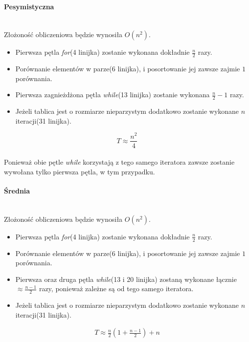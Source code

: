 \paragraph{Pesymistyczna}\mbox{}\\
Złożoność obliczeniowa będzie wynosiła $O(n^2)$.
\begin{itemize}
\item Pierwsza pętla \textit{for}(4 linijka) zostanie wykonana dokładnie $\frac{n}{2}$ razy.
\item Porównanie elementów w parze(6 linijka), i posortowanie jej zawsze zajmie $1$ porównania.
\item Pierwsza zagnieżdżona pętla \textit{while}(13 linijka) zostanie wykonana $\frac{n}{2} -1$ razy.
\item Jeżeli tablica jest o rozmiarze nieparzystym dodatkowo zostanie wykonane $n$ iteracji(31 linijka).
\end{itemize}
\begin{equation*}
T \approx \frac{n^2}{4} 
\end{equation*}
\wyjT\\
Ponieważ obie pętle \textit{while} korzystają z tego samego iteratora zawsze zostanie wywołana tylko pierwsza pętla, w tym przypadku.
\paragraph{Średnia}\mbox{}\\
Złożoność obliczeniowa będzie wynosiła $O(n^2)$.

\begin{itemize}
\item Pierwsza pętla \textit{for}(4 linijka) zostanie wykonana dokładnie $\frac{n}{2}$ razy.
\item Porównanie elementów w parze(6 linijka), i posortowanie jej zawsze zajmie $1$ porównania.
\item Pierwsza oraz druga  pętla \textit{while}(13 i 20 linijka) zostaną wykonane łącznie $\approx \frac{n-1}{2}$ razy, ponieważ zależne są od tego samego iteratora.
\item Jeżeli tablica jest o rozmiarze nieparzystym dodatkowo zostanie wykonane $n$ iteracji(31 linijka).
\end{itemize}
\begin{equation*}
\begin{multlined}
T \approx \frac{n}{2} (1+ \frac{n-1}{2})+ n
\end{multlined}
\end{equation*}

